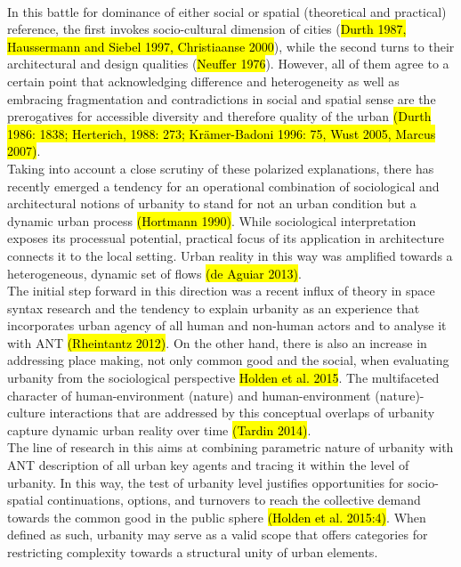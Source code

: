 \documentclass[11pt]{report}
\begin{document}
\\
In this battle for dominance of either social or spatial (theoretical and practical) reference, the first invokes socio-cultural dimension of cities (\hl{Durth 1987, Haussermann and Siebel 1997, Christiaanse 2000}), while the second turns to their architectural and design qualities (\hl{Neuffer 1976}).
However, all of them agree to a certain point that acknowledging difference and heterogeneity as well as embracing fragmentation and contradictions in social and spatial sense are the prerogatives for accessible diversity and therefore quality of the urban \hl{(Durth 1986: 1838; Herterich, 1988: 273; Krämer-Badoni 1996: 75, Wust 2005, Marcus 2007)}. 
\\
Taking into account a close scrutiny of these polarized explanations, there has recently emerged a tendency for an operational combination of sociological and architectural notions of urbanity to stand for not an urban condition but a dynamic urban process \hl{(Hortmann 1990)}.
While sociological interpretation exposes its processual potential, practical focus of its application in architecture connects it to the local setting.
Urban reality in this way was amplified towards a heterogeneous, dynamic set of flows \hl{(de Aguiar 2013)}.
\\
The initial step forward in this direction was a recent influx of theory in space syntax research and the tendency to explain urbanity as an experience that incorporates urban agency of all human and non-human actors and to analyse it with ANT \hl{(Rheintantz 2012)}.
On the other hand, there is also an increase in addressing place making, not only common good and the social, when evaluating urbanity from the sociological perspective \hl{Holden et al. 2015}. 
The multifaceted character of human-environment (nature) and human-environment (nature)-culture interactions that are addressed by this conceptual overlaps of urbanity capture dynamic urban reality over time \hl{(Tardin 2014)}.
\\
The line of research in this aims at combining parametric nature of urbanity with ANT description of all urban key agents and tracing it within the level of urbanity. In this way, the test of urbanity level justifies opportunities for socio-spatial continuations, options, and turnovers to reach the collective demand towards the common good in the public sphere \hl{(Holden et al. 2015:4)}. 
When defined as such, urbanity may serve as a valid scope that offers categories for restricting complexity towards a structural unity of urban elements. 
\end{document}
